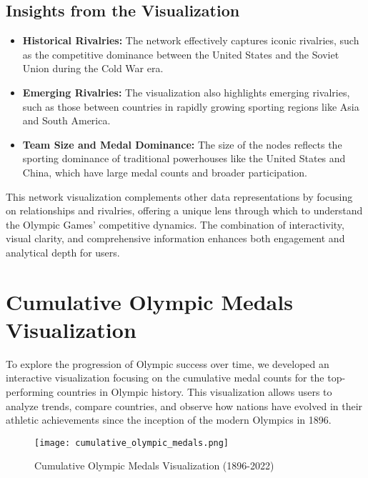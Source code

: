 \subsection{Insights from the Visualization}
\begin{itemize}
    \item \textbf{Historical Rivalries:} The network effectively captures iconic rivalries, such as the competitive dominance between the United States and the Soviet Union during the Cold War era.
    \item \textbf{Emerging Rivalries:} The visualization also highlights emerging rivalries, such as those between countries in rapidly growing sporting regions like Asia and South America.
    \item \textbf{Team Size and Medal Dominance:} The size of the nodes reflects the sporting dominance of traditional powerhouses like the United States and China, which have large medal counts and broader participation.
\end{itemize}

This network visualization complements other data representations by focusing on relationships and rivalries, offering a unique lens through which to understand the Olympic Games' competitive dynamics. The combination of interactivity, visual clarity, and comprehensive information enhances both engagement and analytical depth for users.

\section{Cumulative Olympic Medals Visualization}

To explore the progression of Olympic success over time, we developed an interactive visualization focusing on the cumulative medal counts for the top-performing countries in Olympic history. This visualization allows users to analyze trends, compare countries, and observe how nations have evolved in their athletic achievements since the inception of the modern Olympics in 1896.

\begin{figure}[ht]
    \centering
    \texttt{[image: cumulative\_olympic\_medals.png]}
    \caption{Cumulative Olympic Medals Visualization (1896-2022)}
    \label{fig:cumulative_medals}
\end{figure}

